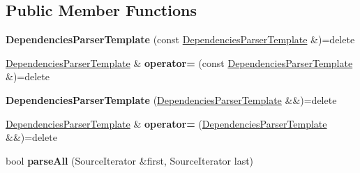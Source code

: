 \subsection*{Public Member Functions}
\begin{DoxyCompactItemize}
\item 
{\bfseries Dependencies\+Parser\+Template} (const \hyperlink{class_mdt_1_1_deploy_utils_1_1_impl_1_1_ldd_1_1_dependencies_parser_template}{Dependencies\+Parser\+Template} \&)=delete\hypertarget{class_mdt_1_1_deploy_utils_1_1_impl_1_1_ldd_1_1_dependencies_parser_template_a65a0fd10f631a6246c67d1261cf205f6}{}\label{class_mdt_1_1_deploy_utils_1_1_impl_1_1_ldd_1_1_dependencies_parser_template_a65a0fd10f631a6246c67d1261cf205f6}

\item 
\hyperlink{class_mdt_1_1_deploy_utils_1_1_impl_1_1_ldd_1_1_dependencies_parser_template}{Dependencies\+Parser\+Template} \& {\bfseries operator=} (const \hyperlink{class_mdt_1_1_deploy_utils_1_1_impl_1_1_ldd_1_1_dependencies_parser_template}{Dependencies\+Parser\+Template} \&)=delete\hypertarget{class_mdt_1_1_deploy_utils_1_1_impl_1_1_ldd_1_1_dependencies_parser_template_aea5f8555e77615f2063a4894e81cf20b}{}\label{class_mdt_1_1_deploy_utils_1_1_impl_1_1_ldd_1_1_dependencies_parser_template_aea5f8555e77615f2063a4894e81cf20b}

\item 
{\bfseries Dependencies\+Parser\+Template} (\hyperlink{class_mdt_1_1_deploy_utils_1_1_impl_1_1_ldd_1_1_dependencies_parser_template}{Dependencies\+Parser\+Template} \&\&)=delete\hypertarget{class_mdt_1_1_deploy_utils_1_1_impl_1_1_ldd_1_1_dependencies_parser_template_a24671ca01c094aae2ed70738ce6830cd}{}\label{class_mdt_1_1_deploy_utils_1_1_impl_1_1_ldd_1_1_dependencies_parser_template_a24671ca01c094aae2ed70738ce6830cd}

\item 
\hyperlink{class_mdt_1_1_deploy_utils_1_1_impl_1_1_ldd_1_1_dependencies_parser_template}{Dependencies\+Parser\+Template} \& {\bfseries operator=} (\hyperlink{class_mdt_1_1_deploy_utils_1_1_impl_1_1_ldd_1_1_dependencies_parser_template}{Dependencies\+Parser\+Template} \&\&)=delete\hypertarget{class_mdt_1_1_deploy_utils_1_1_impl_1_1_ldd_1_1_dependencies_parser_template_aee4cd9c9ea39af21d120caaf93d6608d}{}\label{class_mdt_1_1_deploy_utils_1_1_impl_1_1_ldd_1_1_dependencies_parser_template_aee4cd9c9ea39af21d120caaf93d6608d}

\item 
bool {\bfseries parse\+All} (Source\+Iterator \&first, Source\+Iterator last)\hypertarget{class_mdt_1_1_deploy_utils_1_1_impl_1_1_ldd_1_1_dependencies_parser_template_ac696d3bb7663d41de4959e42325db642}{}\label{class_mdt_1_1_deploy_utils_1_1_impl_1_1_ldd_1_1_dependencies_parser_template_ac696d3bb7663d41de4959e42325db642}


\end{DoxyCompactItemize}
